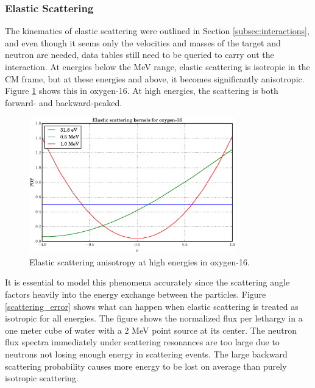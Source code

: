 \subsubsection{Elastic Scattering}

The kinematics of elastic scattering were outlined in Section \ref{subsec:interactions}, and even though it seems only the velocities and masses of the target and neutron are needed, data tables still need to be queried to carry out the interaction.  At energies below the MeV range, elastic scattering is isotropic in the CM frame, but at these energies and above, it becomes significantly anisotropic.  Figure \ref{scattering_anisotropy} shows this in oxygen-16.  At high energies, the scattering is both forward- and backward-peaked.  

\begin{figure}[h!] 
  \centering
    \includegraphics[width=0.8\textwidth]{graphics/scattering_anisotropy.eps}
     \caption{Elastic scattering anisotropy at high energies in oxygen-16.  \label{scattering_anisotropy}}
\end{figure}

It is essential to model this phenomena accurately since the scattering angle factors heavily into the energy exchange between the particles.  Figure \ref{scattering_error} shows what can happen when elastic scattering is treated as isotropic for all energies.  The figure shows the normalized flux per lethargy in a one meter cube of water with a 2 MeV point source at its center.  The neutron flux spectra immediately under scattering resonances are too large due to neutrons not losing enough energy in scattering events.  The large backward scattering probability causes more energy to be lost on average than purely isotropic scattering.

